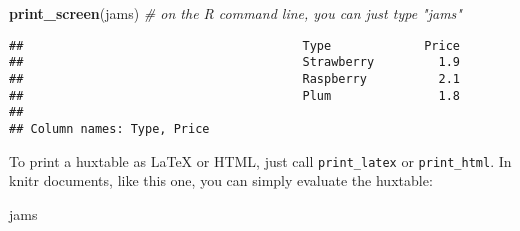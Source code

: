 \documentclass[]{article}
\newenvironment{Shaded}{\begin{snugshade}}{\end{snugshade}}
\newcommand{\CommentTok}[1]{\textcolor[rgb]{0.56,0.35,0.01}{\textit{#1}}}
\newcommand{\KeywordTok}[1]{\textcolor[rgb]{0.13,0.29,0.53}{\textbf{#1}}}
\newcommand{\NormalTok}[1]{#1}
\begin{document}
\begin{Shaded}
\begin{Highlighting}[]
\KeywordTok{print_screen}\NormalTok{(jams)     }\CommentTok{# on the R command line, you can just type "jams"}
\end{Highlighting}
\end{Shaded}

\begin{verbatim}
##                                       Type             Price  
##                                       Strawberry         1.9  
##                                       Raspberry          2.1  
##                                       Plum               1.8  
## 
## Column names: Type, Price
\end{verbatim}

\FloatBarrier

To print a huxtable as LaTeX or HTML, just call \texttt{print\_latex} or
\texttt{print\_html}. In knitr documents, like this one, you can simply
evaluate the huxtable:

\begin{Shaded}
\begin{Highlighting}[]
\NormalTok{jams}
\end{Highlighting}
\end{Shaded}

 
  \providecommand{\huxb}[2]{\arrayrulecolor[RGB]{#1}\global\arrayrulewidth=#2pt}
  \providecommand{\huxvb}[2]{\color[RGB]{#1}\vrule width #2pt}
  \providecommand{\huxtpad}[1]{\rule{0pt}{#1}}
  \providecommand{\huxbpad}[1]{\rule[-#1]{0pt}{#1}}
\end{document}
